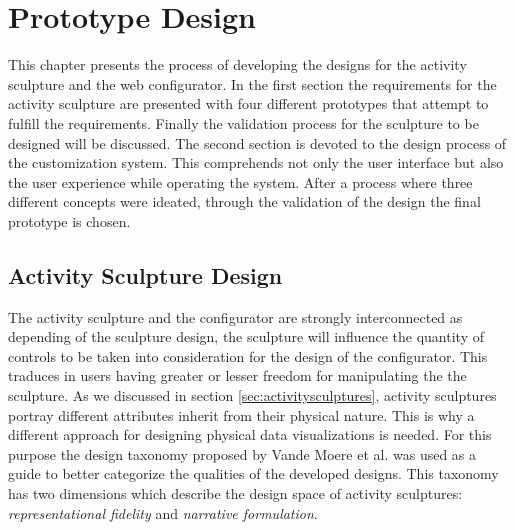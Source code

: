 \documentclass[../medieninformatik-arbeit.tex]{subfiles}
\begin{document}
\section{Prototype Design}
\label{ch:proto}
This chapter presents the process of developing the designs for the activity sculpture and the web configurator. In the first section the requirements for the activity sculpture are presented with four different prototypes that attempt to fulfill the requirements. Finally the validation process for the sculpture to be designed will be discussed. The second section is devoted to the design process of the customization system. This comprehends not only the user interface but also the user experience while operating the system. After a process where three different concepts were ideated, through the validation of the design the final prototype is chosen. 

\subsection{Activity Sculpture Design}
The activity sculpture and the configurator are strongly interconnected as depending of the sculpture design, the sculpture will influence the quantity of controls to be taken into consideration for the design of the configurator. This traduces in users having greater or lesser freedom for manipulating the the sculpture. As we discussed in section \ref{sec:activitysculptures}, activity sculptures portray different attributes inherit from their physical nature. This is why a different approach for designing physical data visualizations is needed. For this purpose the design taxonomy proposed by Vande Moere et al. \cite{vande2009analyzing} was used as a guide to better categorize the qualities of the developed designs. This taxonomy has two dimensions which describe the design space of activity sculptures: \textit{representational fidelity} and \textit{narrative formulation}. 
\end{document}
